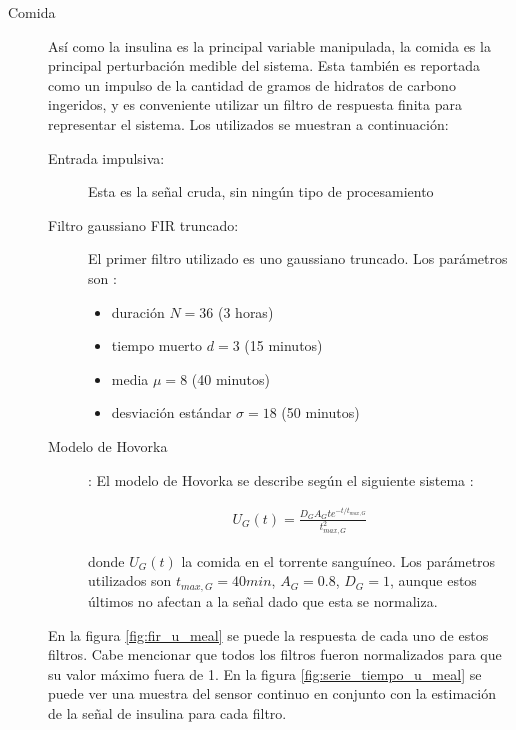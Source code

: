 \begin{description}
\item[Comida] Así como la insulina es la principal variable manipulada, la comida es la principal perturbación medible del sistema. Esta también es reportada como un impulso de la cantidad de gramos de hidratos de carbono ingeridos, y es conveniente utilizar un filtro de respuesta finita para representar el sistema. Los utilizados se muestran a continuación:

\begin{description}

\item [Entrada impulsiva:] Esta es la señal cruda, sin ningún tipo de procesamiento

\item [Filtro gaussiano FIR truncado:] El primer filtro utilizado es uno gaussiano truncado. Los parámetros son \cite{xie2016nonlinear}:

\begin{itemize}
	\item duración $N=36$ (3 horas)
	
	\item tiempo muerto $d=3$ (15 minutos)
	
	\item media $\mu=8$ (40 minutos)
	
	\item desviación estándar $\sigma = 18$ (50 minutos)
	
\end{itemize}

\item [Modelo de Hovorka]: El modelo de Hovorka se describe según el siguiente sistema \cite{hovorka2004nonlinear}:

\begin{eqnarray}
U_G(t) = \frac{D_G A_G t e^{-t/t_{max,G}}}{t_{max,G}^2}
\end{eqnarray}

donde $U_G(t)$ la comida en el torrente sanguíneo. Los parámetros utilizados son $t_{max,G} = 40 min$, $A_G=0.8$, $D_G = 1$, aunque estos últimos no afectan a la señal dado que esta se normaliza.

\end{description}



En la figura \ref{fig:fir_u_meal} se puede la respuesta de cada uno de estos filtros. Cabe mencionar que todos los filtros fueron normalizados para que su valor máximo fuera de 1. En la figura \ref{fig:serie_tiempo_u_meal} se puede ver una muestra del sensor continuo en conjunto con la estimación de la señal de insulina para cada filtro.


\end{description}
